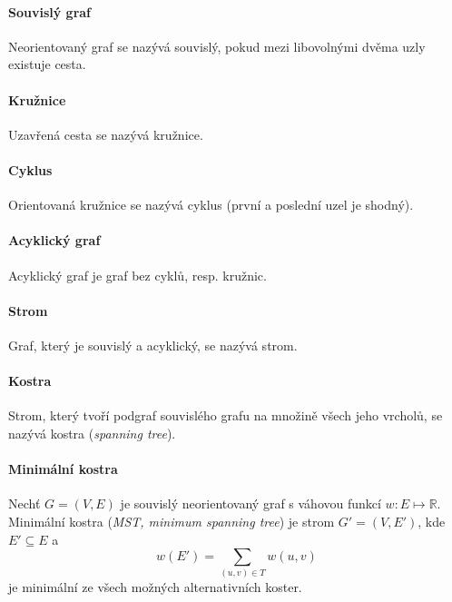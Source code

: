 \paragraph*{Souvislý graf} Neorientovaný graf se nazývá souvislý, pokud mezi libovolnými dvěma uzly existuje cesta.

\paragraph*{Kružnice} Uzavřená cesta se nazývá kružnice.

\paragraph*{Cyklus} Orientovaná kružnice se nazývá cyklus (první a poslední uzel je shodný).


\paragraph*{Acyklický graf} Acyklický graf je graf bez cyklů, resp. kružnic.

\paragraph*{Strom} Graf, který je souvislý a acyklický, se nazývá strom.

\paragraph*{Kostra} Strom, který tvoří podgraf souvislého grafu na množině všech jeho vrcholů, se nazývá kostra (\textit{spanning tree}).

\paragraph*{Minimální kostra} Nechť $G = (V, E)$ je souvislý neorientovaný graf s váhovou funkcí $w : E \mapsto \mathbb{R}$. Minimální kostra (\textit{MST, minimum spanning tree}) je strom $G' = (V, E')$, kde $E' \subseteq E$ a $$w(E') = \sum_{(u,v) \in T} w(u, v)$$ je minimální ze všech možných alternativních koster.


